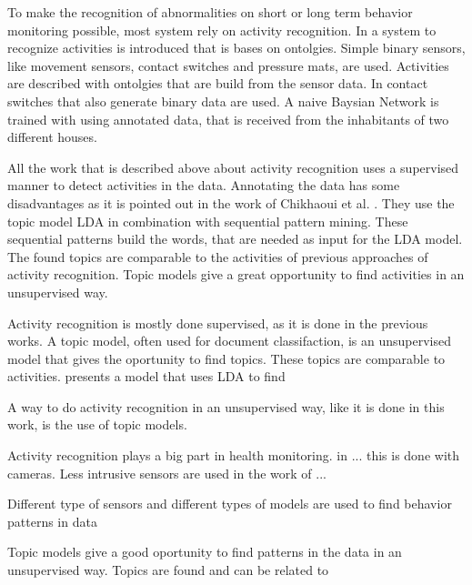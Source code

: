 \documentclass[a4paper,fleqn]{article}
\begin{document}
To make the recognition of abnormalities on short or long term behavior monitoring possible, most system rely on activity recognition. In \cite{Hong2009236} a system to recognize activities is introduced that is bases on ontolgies. Simple binary sensors, like movement sensors, contact switches and pressure mats, are used. Activities are described with ontolgies that are build from the sensor data.
In \cite{Tapia04activityrecognition} contact switches that also generate binary data are used. A naive Baysian Network is trained with using annotated data, that is received from the inhabitants of two different houses.


All the work that is described above about activity recognition uses a supervised manner to detect activities in the data. Annotating the data has some disadvantages as it is pointed out in the work of Chikhaoui et al. \cite{journals/percom/ChikhaouiWP12}. They use the topic model LDA in combination with sequential pattern mining. These sequential patterns build the words, that are needed as input for the LDA model. The found topics are comparable to the activities of previous approaches of activity recognition.
Topic models give a great opportunity to find activities in an unsupervised way.


Activity recognition is mostly done supervised, as it is done in the previous works. A topic model, often used for document classifaction, is an unsupervised model that gives the oportunity to find topics. These topics are comparable to activities. \cite{journals/percom/ChikhaouiWP12} presents a model that uses LDA to find  


A way to do activity recognition in an unsupervised way, like it is done in this work, is the use of topic models. 





Activity recognition plays a big part in health monitoring. in ... this is done with cameras. Less intrusive sensors are used in the work of ...

Different type of sensors and different types of models are used to find behavior patterns in data


Topic models give a good oportunity to find patterns in the data in an unsupervised way. Topics are found and can be related to 
\end{document}
